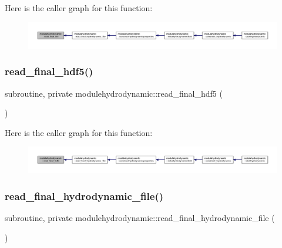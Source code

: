 Here is the caller graph for this function\+:\nopagebreak
\begin{figure}[H]
\begin{center}
\leavevmode
\includegraphics[width=350pt]{namespacemodulehydrodynamic_a24c75082fcb309f40ebc8ab0a0493fc8_icgraph}
\end{center}
\end{figure}
\mbox{\label{namespacemodulehydrodynamic_a7e3a53d388991f1cae4f042edd8cc7fb}} 
\subsubsection{\texorpdfstring{read\+\_\+final\+\_\+hdf5()}{read\_final\_hdf5()}}
{\footnotesize\ttfamily subroutine, private modulehydrodynamic\+::read\+\_\+final\+\_\+hdf5 (\begin{DoxyParamCaption}{ }\end{DoxyParamCaption})\hspace{0.3cm}{\ttfamily [private]}}

Here is the caller graph for this function\+:\nopagebreak
\begin{figure}[H]
\begin{center}
\leavevmode
\includegraphics[width=350pt]{namespacemodulehydrodynamic_a7e3a53d388991f1cae4f042edd8cc7fb_icgraph}
\end{center}
\end{figure}
\mbox{\label{namespacemodulehydrodynamic_aac2dc91eeafc8e79ef7e6399aca89537}} 
\subsubsection{\texorpdfstring{read\+\_\+final\+\_\+hydrodynamic\+\_\+file()}{read\_final\_hydrodynamic\_file()}}
{\footnotesize\ttfamily subroutine, private modulehydrodynamic\+::read\+\_\+final\+\_\+hydrodynamic\+\_\+file (\begin{DoxyParamCaption}{ }\end{DoxyParamCaption})\hspace{0.3cm}{\ttfamily [private]}}

